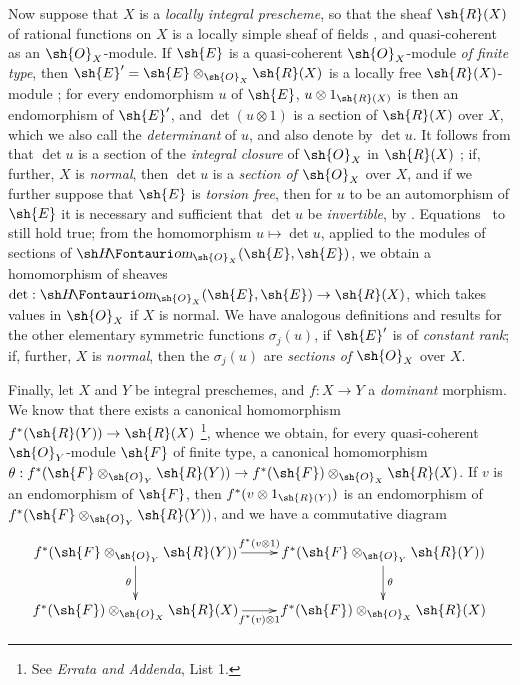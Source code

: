 \begin{env}[6.4.9]
\label{II.6.4.9}
Now suppose that $X$ is a \emph{locally integral prescheme}, so that the sheaf $\sh{R}(X)$ of rational functions on $X$ is a locally simple sheaf of fields , and quasi-coherent as an $\sh{O}_X$-module.
If $\sh{E}$ is a quasi-coherent $\sh{O}_X$-module \emph{of finite type}, then $\sh{E}'=\sh{E}\otimes_{\sh{O}_X}\sh{R}(X)$ is a locally free $\sh{R}(X)$-module ;
for every endomorphism $u$ of $\sh{E}$, $u\otimes1_{\sh{R}(X)}$ is then an endomorphism of $\sh{E}'$, and $\det(u\otimes1)$ is a section of $\sh{R}(X)$ over $X$, which we also call the \emph{determinant} of $u$, and also denote by $\det u$.
It follows from  that $\det u$ is a section of the \emph{integral closure} of $\sh{O}_X$ in $\sh{R}(X)$ ;
if, further, $X$ is \emph{normal}, then $\det u$ is a \emph{section of $\sh{O}_X$} over $X$, and if we further suppose that $\sh{E}$ is \emph{torsion free}, then for $u$ to be an automorphism of $\sh{E}$ it is necessary and sufficient that $\det u$ be \emph{invertible}, by .
Equations~ to  still hold true;
from the homomorphism $u\mapsto\det u$, applied to the modules of sections of $\shHom_{\sh{O}_X}(\sh{E},\sh{E})$, we obtain a homomorphism of sheaves $\det:\shHom_{\sh{O}_X}(\sh{E},\sh{E})\to\sh{R}(X)$, which takes values in $\sh{O}_X$ if $X$ is normal.
We have analogous definitions and results for the other elementary symmetric functions $\sigma_j(u)$, if $\sh{E}'$ is of \emph{constant rank};
if, further, $X$ is \emph{normal}, then the $\sigma_j(u)$ are \emph{sections of $\sh{O}_X$} over $X$.

Finally, let $X$ and $Y$ be integral preschemes, and $f:X\to Y$ a \emph{dominant} morphism.
We know that there exists a canonical homomorphism $f^*(\sh{R}(Y))\to\sh{R}(X)$ \footnote{See \emph{Errata and Addenda}, List 1.}, whence we obtain, for every quasi-coherent $\sh{O}_Y$-module $\sh{F}$ of finite type, a canonical homomorphism $\theta:f^*(\sh{F}\otimes_{\sh{O}_Y}\sh{R}(Y))\to f^*(\sh{F})\otimes_{\sh{O}_X}\sh{R}(X)$.
If $v$ is an endomorphism of $\sh{F}$, then $f^*(v\otimes1_{\sh{R}(Y)})$ is an endomorphism of $f^*(\sh{F}\otimes_{\sh{O}_Y}\sh{R}(Y))$, and we have a commutative diagram
\[
  \xymatrix{
    f^*(\sh{F}\otimes_{\sh{O}_Y}\sh{R}(Y))
      \ar[r]^{f^*(v\otimes1)}
      \ar[d]_{\theta}
    & f^*(\sh{F}\otimes_{\sh{O}_Y}\sh{R}(Y))
      \ar[d]^{\theta}
  \\f^*(\sh{F})\otimes_{\sh{O}_X}\sh{R}(X)
      \ar[r]_{f^*(v)\otimes1}
    & f^*(\sh{F})\otimes_{\sh{O}_X}\sh{R}(X)
  }
\]


\end{env}
